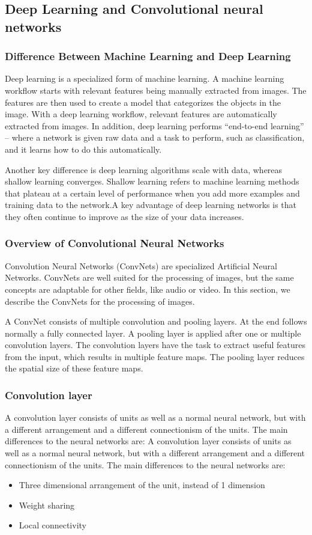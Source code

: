 \subsection{Deep Learning and Convolutional neural networks}
\subsubsection*{Difference Between Machine Learning and Deep Learning}
Deep learning is a specialized form of machine learning. A machine learning workflow starts with relevant features being manually extracted from images. The features are then used to create a model that categorizes the objects in the image. With a deep learning workflow, relevant features are automatically extracted from images. In addition, deep learning performs “end-to-end learning” – where a network is given raw data and a task to perform, such as classification, and it learns how to do this automatically.

Another key difference is deep learning algorithms scale with data, whereas shallow learning converges. Shallow learning refers to machine learning methods that plateau at a certain level of performance when you add more examples and training data to the network.A key advantage of deep learning networks is that they often continue to improve as the size of your data increases.

\subsubsection*{Overview of Convolutional Neural Networks}
Convolution Neural Networks (ConvNets) are specialized Artificial Neural Networks. ConvNets are well suited for the processing of images, but the same concepts are adaptable for other fields, like audio or video. In this section, we describe the ConvNets for the processing of images.

A ConvNet consists of multiple convolution and pooling layers. At the end follows normally a fully connected layer. A pooling layer is applied after one or multiple convolution layers. The convolution layers have the task to extract useful features from the input, which results in multiple feature maps. The pooling layer reduces the spatial size of these feature maps.

\subsubsection*{Convolution layer}
A convolution layer consists of units as well as a normal neural network, but with a different arrangement and a different connectionism of the units. The main differences to the neural networks are:
 A convolution layer consists of units as well as a normal neural network, but with a different arrangement and a different connectionism of the units. The main differences to the neural networks are:
	\begin{itemize}
		\item Three dimensional arrangement of the unit, instead of 1 dimension
		\item Weight sharing
		\item Local connectivity
	\end{itemize}

